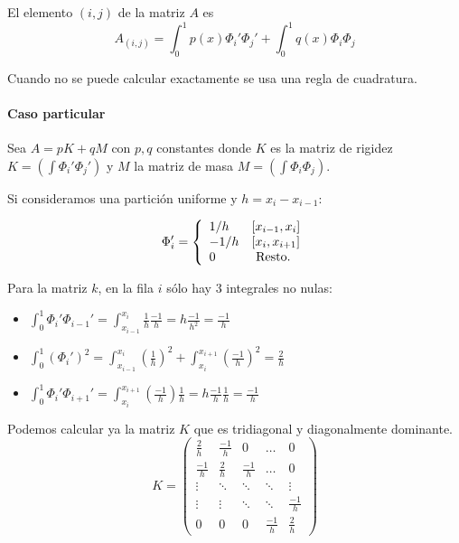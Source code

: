 	El elemento $(i,j)$ de la matriz $A$ es
	$$A_{(i,j)} = \int_0^1 p(x) \Phi_i'\Phi_j' + \int_0^1 q(x)\Phi_i\Phi_j$$
	
	Cuando no se puede calcular exactamente se usa una regla de cuadratura.
	
	\paragraph{Caso particular}
	Sea $A = pK+qM$ con $p,q$ constantes donde $K$ es la matriz de rigidez
	$K = (\int \Phi_i'\Phi_j')$ y $M$ la matriz de masa $M = (\int \Phi_i\Phi_j)$.
	
	Si consideramos una partición uniforme y $h = x_i - x_{i-1}$:
	
	\begin{equation*}
		\Phi_i'=\left\{
		\begin{array}{l l l}
			1/h & [x_{i-1}, x_i]\\
			-1/h & [x_i, x_{i+1}]\\
			0 & \text{ Resto.}
		\end{array}
		\right.
	\end{equation*}
	
	Para la matriz $k$, en la fila $i$ sólo hay 3 integrales no nulas:
	\begin{itemize}
		\item $\int_{0}^{1} \Phi_i'\Phi_{i-1}' = \int_{x_{i-1}}^{x_i} \frac{1}{h}\frac{-1}{h} = h\frac{-1}{h^2} = \frac{-1}{h}$
		
		\item $\int_{0}^{1}(\Phi_i')^2 = \int_{x_{i-1}}^{x_i}(\frac{1}{h})^2 + \int_{x_i}^{x_{i+1}} (\frac{-1}{h})^2 = \frac{2}{h}$
		
		\item $\int_0^1 \Phi_i'\Phi_{i+1}'=\int_{x_i}^{x_{i+1}}(\frac{-1}{h})\frac{1}{h} = h\frac{-1}{h}\frac{1}{h}= \frac{-1}{h}$
	\end{itemize}
	
	Podemos calcular ya la matriz $K$ que es tridiagonal y diagonalmente dominante.
	\begin{equation*}
		K = \begin{pmatrix}
			\frac{2}{h} & \frac{-1}{h} & 0 & \hdots & 0\\
			\frac{-1}{h} & \frac{2}{h} & \frac{-1}{h} & \hdots & 0\\
			\vdots & \ddots & \ddots & \ddots & \vdots\\
			\vdots & \vdots & \ddots & \ddots &  \frac{-1}{h}\\
			0 & 0 & 0 & \frac{-1}{h} & \frac{2}{h}
		\end{pmatrix}
	\end{equation*}
	

